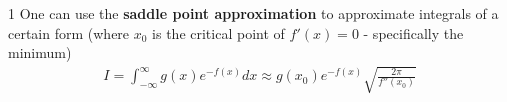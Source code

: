 \begin{defn}{1}
One can use the \textbf{saddle point approximation} to approximate integrals of a certain form (where $x_0$ is the critical point of $f'(x)=0$ - specifically the minimum)
\begin{align}
I = \int_{-\infty}^{\infty}g(x)e^{-f(x)}dx \approx g(x_0)e^{-f(x)}\sqrt{\frac{2\pi}{f''(x_0)
}}
\end{align}
\end{defn}

